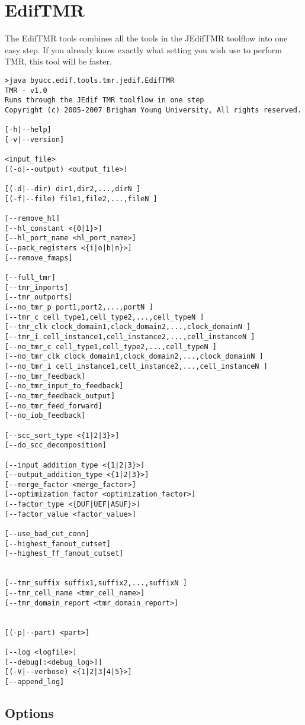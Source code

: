 \section{EdifTMR}
The EdifTMR tools combines all the tools in the JEdifTMR toolflow into
one easy step. If you already know exactly what setting you wish use
to perform TMR, this tool will be faster.

\begin{verbatim}
>java byucc.edif.tools.tmr.jedif.EdifTMR
TMR - v1.0 
Runs through the JEdif TMR toolflow in one step
Copyright (c) 2005-2007 Brigham Young University, All rights reserved.

[-h|--help]
[-v|--version]

<input_file> 
[(-o|--output) <output_file>]

[(-d|--dir) dir1,dir2,...,dirN ]
[(-f|--file) file1,file2,...,fileN ]

[--remove_hl]
[--hl_constant <{0|1}>]
[--hl_port_name <hl_port_name>]
[--pack_registers <{i|o|b|n}>]
[--remove_fmaps]

[--full_tmr]
[--tmr_inports]
[--tmr_outports]
[--no_tmr_p port1,port2,...,portN ]
[--tmr_c cell_type1,cell_type2,...,cell_typeN ]
[--tmr_clk clock_domain1,clock_domain2,...,clock_domainN ]
[--tmr_i cell_instance1,cell_instance2,...,cell_instanceN ]
[--no_tmr_c cell_type1,cell_type2,...,cell_typeN ]
[--no_tmr_clk clock_domain1,clock_domain2,...,clock_domainN ]
[--no_tmr_i cell_instance1,cell_instance2,...,cell_instanceN ]
[--no_tmr_feedback]
[--no_tmr_input_to_feedback]
[--no_tmr_feedback_output]
[--no_tmr_feed_forward]
[--no_iob_feedback]

[--scc_sort_type <{1|2|3}>]
[--do_scc_decomposition]

[--input_addition_type <{1|2|3}>]
[--output_addition_type <{1|2|3}>]
[--merge_factor <merge_factor>]
[--optimization_factor <optimization_factor>]
[--factor_type <{DUF|UEF|ASUF}>]
[--factor_value <factor_value>]

[--use_bad_cut_conn]
[--highest_fanout_cutset]
[--highest_ff_fanout_cutset]


[--tmr_suffix suffix1,suffix2,...,suffixN ]
[--tmr_cell_name <tmr_cell_name>]
[--tmr_domain_report <tmr_domain_report>]


[(-p|--part) <part>]

[--log <logfile>]
[--debug[:<debug_log>]]
[(-V|--verbose) <{1|2|3|4|5}>]
[--append_log]

\end{verbatim}
\subsection{Options}

